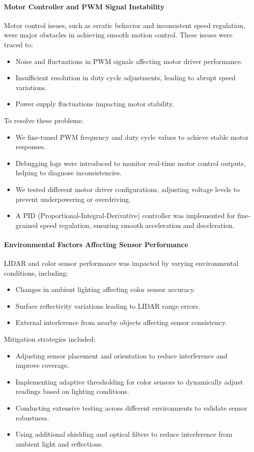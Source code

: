 \documentclass[english,project]{buwthesis}
\begin{document}
\paragraph{Motor Controller and PWM Signal Instability}
Motor control issues, such as erratic behavior and inconsistent speed regulation, were major obstacles in achieving smooth motion control. These issues were traced to:
\begin{itemize}
\item Noise and fluctuations in PWM signals affecting motor driver performance.
\item Insufficient resolution in duty cycle adjustments, leading to abrupt speed variations.
\item Power supply fluctuations impacting motor stability.
\end{itemize}

To resolve these problems:
\begin{itemize}
\item We fine-tuned PWM frequency and duty cycle values to achieve stable motor responses.
\item Debugging logs were introduced to monitor real-time motor control outputs, helping to diagnose inconsistencies.
\item We tested different motor driver configurations, adjusting voltage levels to prevent underpowering or overdriving.
\item A PID (Proportional-Integral-Derivative) controller was implemented for fine-grained speed regulation, ensuring smooth acceleration and deceleration.
\end{itemize}

\paragraph{Environmental Factors Affecting Sensor Performance}
LIDAR and color sensor performance was impacted by varying environmental conditions, including:
\begin{itemize}
\item Changes in ambient lighting affecting color sensor accuracy.
\item Surface reflectivity variations leading to LIDAR range errors.
\item External interference from nearby objects affecting sensor consistency.
\end{itemize}

Mitigation strategies included:
\begin{itemize}
\item Adjusting sensor placement and orientation to reduce interference and improve coverage.
\item Implementing adaptive thresholding for color sensors to dynamically adjust readings based on lighting conditions.
\item Conducting extensive testing across different environments to validate sensor robustness.
\item Using additional shielding and optical filters to reduce interference from ambient light and reflections.
\end{itemize}
\end{document}
